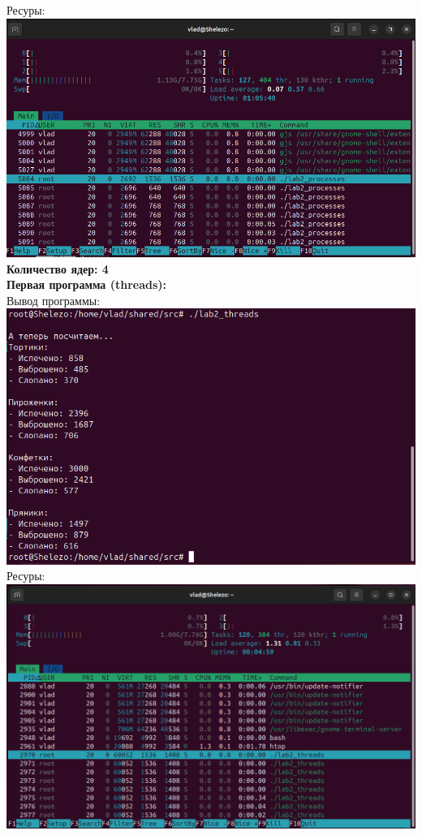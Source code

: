 \documentclass[a4paper,14pt]{extarticle}
\begin{document}
Ресуры:\\
\includegraphics[width=140mm]{processes_resources_6}\bigbreak
\textbf{Количество ядер: 4}\\
\textbf{Первая программа (threads):}\\
Вывод программы:\\
\includegraphics[width=140mm]{threads_output_4}\\
Ресуры:\\
\includegraphics[width=140mm]{threads_resources_4}\\
\end{document}
